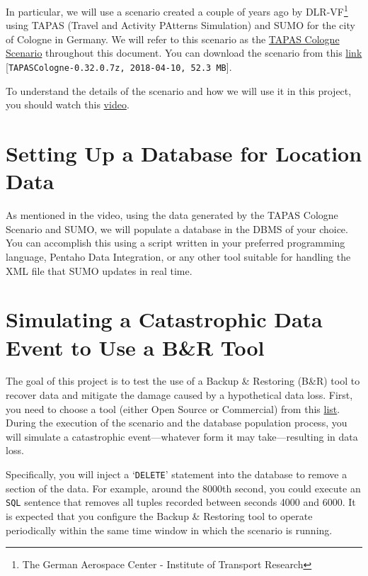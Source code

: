 \documentclass{article}
\begin{document}
In particular, we will use a scenario created a couple of years ago by DLR-VF\footnote{The German Aerospace Center - Institute of Transport Research} using TAPAS (Travel and Activity PAtterns Simulation) and SUMO for the city of Cologne in Germany. We will refer to this scenario as the \href{https://sumo.dlr.de/docs/Data/Scenarios/TAPASCologne.html}{TAPAS Cologne Scenario} throughout this document. You can download the scenario from this \href{https://sourceforge.net/projects/sumo/files/traffic_data/scenarios/TAPASCologne/}{link} [\texttt{TAPASCologne-0.32.0.7z, 2018-04-10, 52.3 MB}].

To understand the details of the scenario and how we will use it in this project, you should watch this \href{https://drive.google.com/file/d/1Deg6SjXcAUJahbNQ_YmvbhmbWuaVtD6y/view?usp=sharing}{video}.

\section{Setting Up a Database for Location Data}
As mentioned in the video, using the data generated by the TAPAS Cologne Scenario and SUMO, we will populate a database in the DBMS of your choice. You can accomplish this using a script written in your preferred programming language, Pentaho Data Integration, or any other tool suitable for handling the XML file that SUMO updates in real time.

\section{Simulating a Catastrophic Data Event to Use a B\&R Tool}
The goal of this project is to test the use of a Backup \& Restoring (B\&R) tool to recover data and mitigate the damage caused by a hypothetical data loss. First, you need to choose a tool (either Open Source or Commercial) from this \href{https://drive.google.com/file/d/1A4_ULvTF3iUMQHjMEiIFmrQ9l0ngqp07/view?usp=sharing}{list}. During the execution of the scenario and the database population process, you will simulate a catastrophic event—whatever form it may take—resulting in data loss.

Specifically, you will inject a `\texttt{DELETE}' statement into the database to remove a section of the data. For example, around the 8000th second, you could execute an \texttt{SQL} sentence that removes all tuples recorded between seconds 4000 and 6000. It is expected that you configure the Backup \& Restoring tool to operate periodically within the same time window in which the scenario is running.
\end{document}
